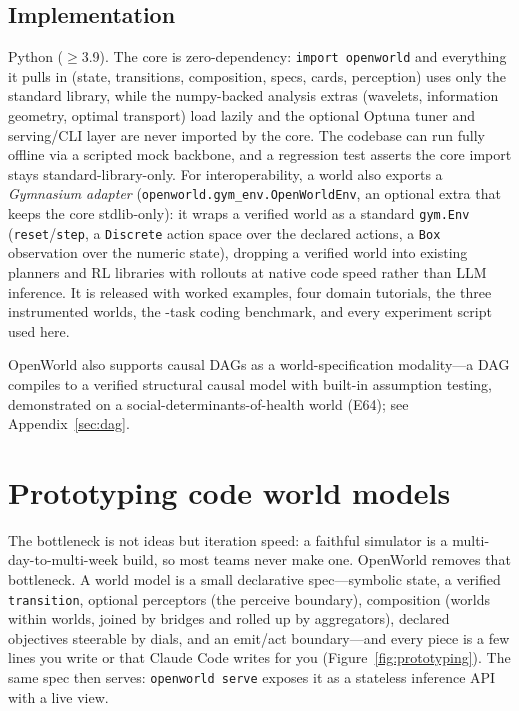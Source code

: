 \documentclass[11pt]{article}
\begin{document}
\subsection{Implementation}
Python ($\geq$3.9). The core is zero-dependency: \texttt{import
openworld} and everything it pulls in (state, transitions, composition, specs,
cards, perception) uses only the standard library, while the numpy-backed
analysis extras (wavelets, information geometry, optimal transport) load lazily
and the optional Optuna tuner and serving/CLI layer are never imported by the
core. The codebase can run fully offline via a scripted mock backbone, and a
regression test asserts the core import stays standard-library-only. For interoperability, a world also exports a \emph{Gymnasium adapter}
(\texttt{openworld.gym\_env.OpenWorldEnv}, an optional extra that keeps the core stdlib-only):
it wraps a verified world as a standard \texttt{gym.Env} (\texttt{reset}/\texttt{step}, a
\texttt{Discrete} action space over the declared actions, a \texttt{Box} observation over the
numeric state), dropping a verified world into existing planners and RL libraries with rollouts
at native code speed rather than LLM inference. It is released with worked examples, four domain
tutorials, the three instrumented worlds, the \NumTasks-task coding benchmark, and every
experiment script used here.

OpenWorld also supports causal DAGs as a world-specification modality---a DAG compiles to a verified structural causal model with built-in assumption testing, demonstrated on a social-determinants-of-health world (E64); see Appendix~\ref{sec:dag}.

\section{Prototyping code world models}\label{sec:prototyping}
The bottleneck is not ideas but iteration speed: a faithful simulator is a
multi-day-to-multi-week build, so most teams never make one. OpenWorld removes that
bottleneck. A world model is
a small declarative spec---symbolic state, a verified \texttt{transition}, optional
perceptors (the perceive boundary), composition (worlds within worlds, joined by
bridges and rolled up by aggregators), declared objectives steerable by dials, and an
emit/act boundary---and every piece is a few lines you write or that Claude Code writes
for you (Figure~\ref{fig:prototyping}). The same spec then serves: \texttt{openworld
serve} exposes it as a stateless inference API with a live view.
\end{document}
